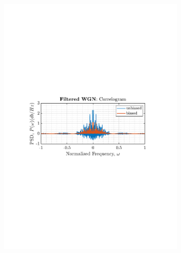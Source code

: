 \documentclass[12pt]{article}
\numberwithin{equation}{section}
\begin{document}
\begin{figure}[H]
\begin{subfigure}{0.49\textwidth}
			\includegraphics[trim={2.2cm 11cm 3.15cm  11.2cm}, clip, width=\textwidth]{../MATLAB/figures/q1_3a_fig05.pdf} 
		\end{subfigure}
				\begin{subfigure}{0.49\textwidth}
			\centering

\end{subfigure}
\end{figure}
\end{document}
